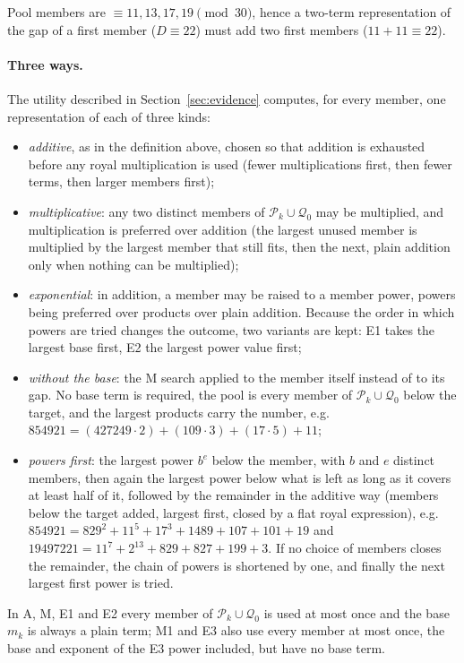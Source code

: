 \documentclass[11pt,a4paper]{article}
\newcommand{\Q}{\mathcal{Q}}
\newcommand{\Pool}{\mathcal{P}}
\begin{document}
Pool members are $\equiv 11,13,17,19 \pmod{30}$, hence a two-term
representation of the gap of a first member ($D\equiv22$) must add two
first members ($11+11\equiv22$).

\paragraph{Three ways.}
The utility described in Section~\ref{sec:evidence} computes, for every
member, one representation of each of three kinds:
\begin{itemize}[nosep]
\item[\textbf{A}] \emph{additive}, as in the definition above, chosen so that
  addition is exhausted before any royal multiplication is used (fewer
  multiplications first, then fewer terms, then larger members first);
\item[\textbf{M}] \emph{multiplicative}: any two distinct members of
  $\Pool_k\cup\Q_0$ may be multiplied, and multiplication is preferred over
  addition (the largest unused member is multiplied by the largest member
  that still fits, then the next, plain addition only when nothing can be
  multiplied);
\item[\textbf{E}] \emph{exponential}: in addition, a member may be raised to
  a member power, powers being preferred over products over plain addition.
  Because the order in which powers are tried changes the outcome, two
  variants are kept: E1 takes the largest base first, E2 the largest power
  value first;
\item[\textbf{M1}] \emph{without the base}: the M search applied to the
  member itself instead of to its gap. No base term is required, the pool
  is every member of $\Pool_k\cup\Q_0$ below the target, and the largest
  products carry the number, e.g.
  $854921 = (427249\cdot 2) + (109\cdot 3) + (17\cdot 5) + 11$;
\item[\textbf{E3}] \emph{powers first}: the largest power $b^e$ below the
  member, with $b$ and $e$ distinct members, then again the largest power
  below what is left as long as it covers at least half of it, followed by
  the remainder in the additive way (members below the target added,
  largest first, closed by a flat royal expression), e.g.
  $854921 = 829^2 + 11^5 + 17^3 + 1489 + 107 + 101 + 19$ and
  $19497221 = 11^7 + 2^{13} + 829 + 827 + 199 + 3$. If no choice of
  members closes the remainder, the chain of powers is shortened by one,
  and finally the next largest first power is tried.
\end{itemize}
In A, M, E1 and E2 every member of $\Pool_k\cup\Q_0$ is used at most once
and the base $m_k$ is always a plain term; M1 and E3 also use every member
at most once, the base and exponent of the E3 power included, but have no
base term.
\end{document}
